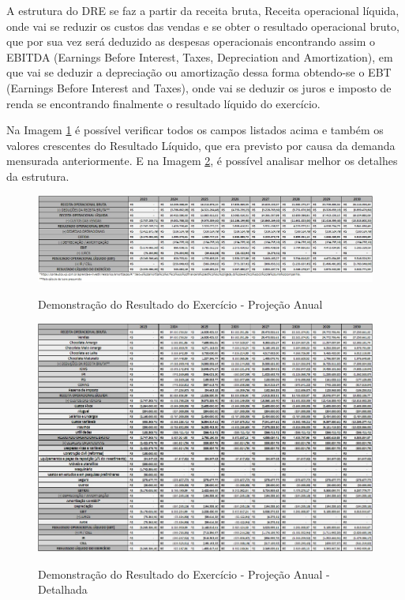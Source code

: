 \documentclass[
	12pt,				%
	openright,			%
	oneside,			%
	a4paper,			%
	english,			%
	french,				%
	spanish,			%
	brazil				%
	]{abntex2}
\begin{document}
A estrutura do DRE  se faz a partir da receita bruta, Receita operacional líquida, onde vai se reduzir os custos das vendas e se obter o resultado operacional bruto, que por sua vez será deduzido as despesas operacionais encontrando assim o EBITDA (Earnings Before Interest, Taxes, Depreciation and Amortization), em que vai se deduzir a depreciação ou amortização dessa forma obtendo-se o EBT (Earnings Before Interest and Taxes), onde vai se deduzir os juros e imposto de renda se encontrando finalmente o resultado líquido do exercício.

Na Imagem \ref{dre} é possível verificar todos os campos listados acima e também os valores crescentes do Resultado Líquido, que era previsto por causa da demanda mensurada anteriormente. E na Imagem \ref{dre2}, é possível analisar melhor os detalhes da estrutura.

\begin{landscape}

\begin{figure}[]
\begin{center}
\caption{Demonstração do Resultado do Exercício - Projeção Anual}
\includegraphics[scale=0.6]{a6.jpeg} 
\label{dre}
\end{center}
\end{figure}

\end{landscape}

\begin{landscape}

\begin{figure}[]
\begin{center}
\caption{Demonstração do Resultado do Exercício - Projeção Anual - Detalhada}
\includegraphics[scale=0.7]{a8.jpeg} 
\label{dre2}
\end{center}
\end{figure}

\end{landscape}
\end{document}
